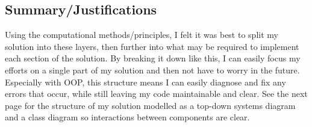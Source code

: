 \subsection{Summary/Justifications}

Using the computational methods/principles, I felt it was best to split my solution into these layers, then further into what may be required to implement each section of the solution. By breaking it down like this, I can easily focus my efforts on a single part of my solution and then not have to worry in the future. Especially with OOP, this structure means I can easily diagnose and fix any errors that occur, while still leaving my code maintainable and clear. See the next page for the structure of my solution modelled as a top-down systems diagram and a class diagram so interactions between components are clear.

\newpage


